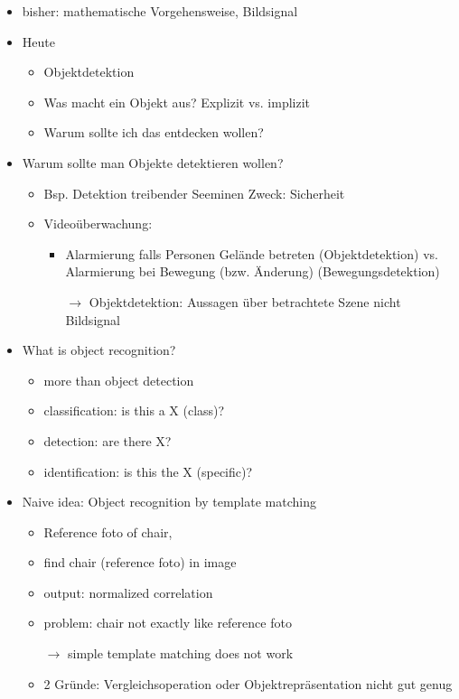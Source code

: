 \documentclass{report}
\begin{document}
	\begin{itemize}
		\item bisher: mathematische Vorgehensweise, Bildsignal
		\item Heute
		\begin{itemize}
			\item Objektdetektion
			\item Was macht ein Objekt aus?
			\newline Explizit vs. implizit
			\item Warum sollte ich das entdecken wollen?
		\end{itemize}
		
		\item Warum sollte man Objekte detektieren wollen?
		\begin{itemize}
			\item Bsp. Detektion treibender Seeminen
			\newline Zweck: Sicherheit
			\item Videoüberwachung:
			\begin{itemize}
				\item Alarmierung falls Personen Gelände betreten (Objektdetektion) vs. Alarmierung bei Bewegung (bzw. Änderung) (Bewegungsdetektion)
				\item[$\rightarrow$] Objektdetektion: Aussagen über betrachtete Szene nicht Bildsignal
			\end{itemize}
			
		\end{itemize}
		
		\item What is object recognition?
		\begin{itemize}
			\item more than object detection
			\item classification: is this a X (class)?
			\item detection: are there X?
			\item identification: is this the X (specific)?
		\end{itemize}
		
		\item Naive idea: Object recognition by template matching
		\begin{itemize}
			\item Reference foto of chair, 
			\item find chair (reference foto) in image
			\item output: normalized correlation
			\item problem: chair not exactly like reference foto
			\item[$\rightarrow$] simple template matching does not work
			\item 2 Gründe: Vergleichsoperation oder Objektrepräsentation nicht gut genug
		\end{itemize}
		

\end{itemize}
\end{document}
